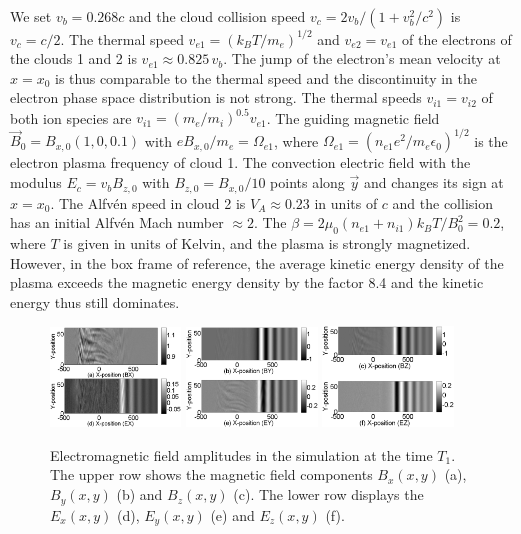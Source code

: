 \documentclass[structabstract]{aa}
\begin{document}
We set $v_b=0.268c$ and the cloud collision speed $v_c = 2v_b / (1+v_b^2/c^2)$ 
is $v_c = c/2$. The thermal speed $v_{e1} = {(k_B T / m_e)}^{1/2}$ and $v_{e2}
=v_{e1}$ of the electrons of the clouds 1 and 2 is $v_{e1} \approx 0.825 \, 
v_b$. The jump of the electron's mean velocity at $x=x_0$ is thus comparable 
to the thermal speed and the discontinuity in the electron phase space 
distribution is not strong. The thermal speeds $v_{i1} = v_{i2}$ of both
ion species are $v_{i1} = {(m_e / m_i)}^{0.5} v_{e1}$. The guiding 
magnetic field $\vec{B}_0 = B_{x,0} (1,0,0.1)$ with $eB_{x,0} / m_e = 
\Omega_{e1}$, where $\Omega_{e1} = {(n_{e1}e^2/m_e \epsilon_0)}^{1/2}$ is the 
electron plasma frequency of cloud 1. The convection electric field with 
the modulus $E_c = v_b B_{z,0}$ with $B_{z,0} = B_{x,0}/10$ points along 
$\vec{y}$ and changes its sign at $x=x_0$. The Alfv\'en speed in cloud 2 is 
$V_A \approx 0.23$ in units of $c$ and the collision has an initial Alfv\'en 
Mach number $\approx 2$. The $\beta = 2\mu_0 (n_{e1} + n_{i1}) k_BT / B^2_0 
= 0.2$, where $T$ is given in units of Kelvin, and the plasma is strongly 
magnetized. However, in the box frame of reference, the average kinetic 
energy density of the plasma exceeds the magnetic energy density by the 
factor 8.4 and the kinetic energy thus still dominates.

\begin{figure}
\centering
\includegraphics[width=0.31\textwidth]{Fig2a.eps}
\includegraphics[width=0.31\textwidth]{Fig2b.eps}
\includegraphics[width=0.31\textwidth]{Fig2c.eps}
\caption{Electromagnetic field amplitudes in the simulation at the time 
$T_1$. The upper row shows the magnetic field components $B_x (x,y)$ (a), 
$B_y (x,y)$ (b) and $B_z (x,y)$ (c). The lower row displays the $E_x (x,y)$ 
(d), $E_y (x,y)$ (e) and $E_z (x,y)$ (f).}\label{Fig2}
\end{figure}
\end{document}
